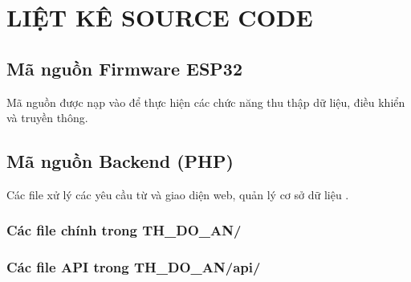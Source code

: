 
\chapter{LIỆT KÊ SOURCE CODE} %

\label{AppendixB} %


\section{Mã nguồn Firmware ESP32}
Mã nguồn  được nạp vào  để thực hiện các chức năng thu thập dữ liệu, điều khiển  và truyền thông.

\section{Mã nguồn Backend (PHP)}
Các file  xử lý các yêu cầu từ  và giao diện web, quản lý cơ sở dữ liệu .
\subsection{Các file chính trong TH\_DO\_AN/}

\subsection{Các file API trong TH\_DO\_AN/api/}

